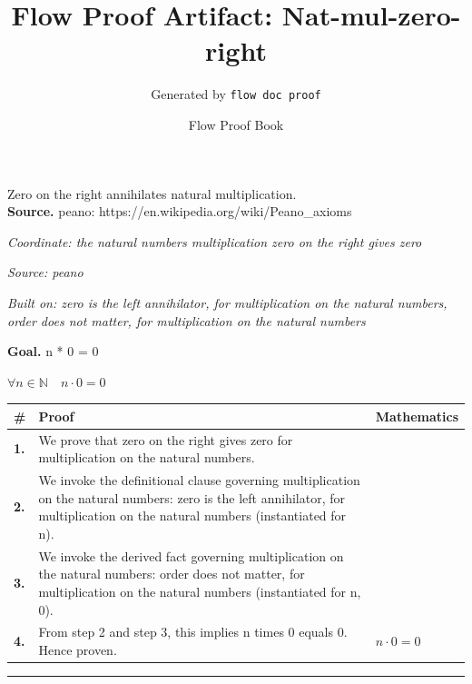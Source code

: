 \documentclass[11pt]{article}
\title{Flow Proof Artifact: Nat-mul-zero-right}
\author{Generated by \texttt{flow doc proof}}
\date{Flow Proof Book}
\theoremstyle{definition}
\begin{document}
\maketitle
Zero on the right annihilates natural multiplication.\\[0.5em]
\textbf{Source.} peano: https://en.wikipedia.org/wiki/Peano\_axioms\\[0.5em]
\bigskip
{}\par
\smallskip\noindent\textit{Coordinate: the natural numbers \cdot multiplication \cdot zero on the right gives zero}\par
\smallskip\noindent\textit{Source: peano}\par
\smallskip\noindent\textit{Built on: zero is the left annihilator, for multiplication on the natural numbers, order does not matter, for multiplication on the natural numbers}\par
\medskip
\noindent\textbf{Goal.} n * 0 = 0\par
\noindent$\displaystyle \forall n \in \mathbb{N}\quad n \cdot 0 = 0$\par
\medskip
\noindent
\begin{tabular}{@{} >{\raggedright\arraybackslash}p{} >{\raggedright\arraybackslash}p{} >{\raggedleft\arraybackslash}p{} @{}}
\textbf{\#} & \textbf{Proof} & \textbf{Mathematics} \\
\midrule
\textbf{1.} & We prove that zero on the right gives zero for multiplication on the natural numbers. & \\[0.45em]
\textbf{2.} & We invoke the definitional clause governing multiplication on the natural numbers: zero is the left annihilator, for multiplication on the natural numbers (instantiated for n). & \\[0.45em]
\textbf{3.} & We invoke the derived fact governing multiplication on the natural numbers: order does not matter, for multiplication on the natural numbers (instantiated for n, 0). & \\[0.45em]
\textbf{4.} & From step 2 and step 3, this implies n times 0 equals 0. Hence proven. & $\displaystyle n \cdot 0 = 0$ \\[0.45em]
\bottomrule
\end{tabular}
\label{thm:Nat-multiplication-zero_on_the_right_gives_zero}
\par\medskip\hrule
\end{document}
